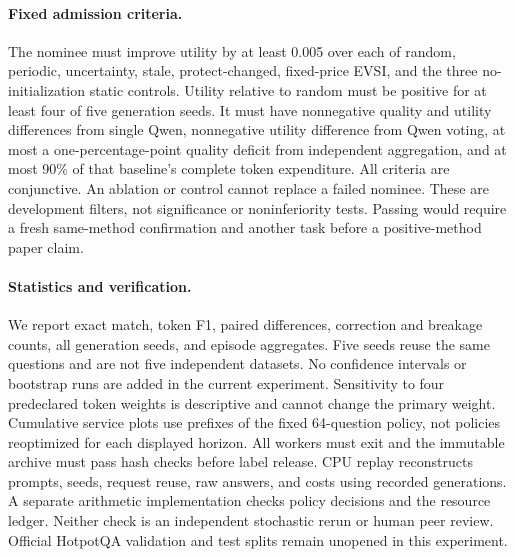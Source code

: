 \paragraph{Fixed admission criteria.}
The nominee must improve utility by at least 0.005 over each of random,
periodic, uncertainty, stale, protect-changed, fixed-price EVSI, and the three
no-initialization static controls. Utility relative to random must be positive
for at least four of five generation seeds. It must have nonnegative quality
and utility differences from single Qwen, nonnegative utility difference from
Qwen voting, at most a one-percentage-point quality deficit from independent
aggregation, and at most 90\% of that baseline's complete token expenditure.
All criteria are conjunctive. An ablation or control cannot replace a failed
nominee. These are development filters, not significance or noninferiority
tests. Passing would require a fresh same-method confirmation and another
task before a positive-method paper claim.

\paragraph{Statistics and verification.}
We report exact match, token F1, paired differences, correction and breakage
counts, all generation seeds, and episode aggregates. Five seeds reuse the
same questions and are not five independent datasets. No confidence intervals
or bootstrap runs are added in the current experiment. Sensitivity to four
predeclared token weights is descriptive and cannot change the primary
weight. Cumulative service plots use prefixes of the fixed 64-question policy,
not policies reoptimized for each displayed horizon.
All workers must exit and the immutable archive must pass hash checks before
label release. CPU replay reconstructs prompts, seeds, request reuse, raw
answers, and costs using recorded generations. A separate arithmetic
implementation checks policy decisions and the resource ledger. Neither
check is an independent stochastic rerun or human peer review. Official HotpotQA
validation and test splits remain unopened in this experiment.
